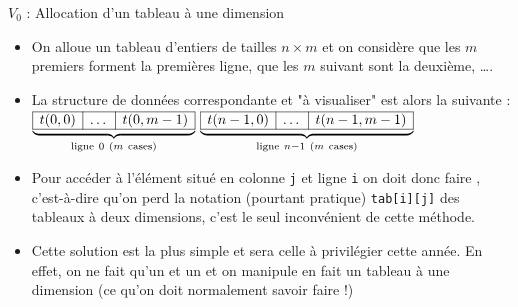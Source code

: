\documentclass[10pt]{beamer}
\begin{document}
\begin{frame}[fragile]{\Ctitle}{\stitle}
	\begin{block}{$V_0$ : Allocation d'un tableau à une dimension}
		\begin{itemize}
			\item<1-> On alloue un tableau d'entiers de tailles $n \times m$ et on considère que les $m$ premiers forment la premières ligne, que les $m$ suivant sont la deuxième, \dots.
			\item<2-> La structure de données correspondante et "à visualiser" est alors la suivante : \\
				$\underbrace{\begin{array}{|c|c|c|} \hline t(0,0)& \dots & t(0,m-1)\\ \hline \end{array}}_{\mathrm{ligne\ }0 \ (m \mathrm{\ cases})}$
				\dotfill
				$\underbrace{\begin{array}{|c|c|c|} \hline t(n-1,0)& \dots & t(n-1,m-1)\\ \hline \end{array}}_{\mathrm{ligne\ }n-1 \ (m \mathrm{\ cases})}$
			\item<3-> Pour accéder à l'élément situé en colonne {\tt j} et ligne {\tt i} on doit donc faire , c'est-à-dire qu'on perd la notation (pourtant pratique) {\tt tab[i][j]} des tableaux à deux dimensions, c'est le seul inconvénient de cette méthode.
			\item<4-> \textcolor{BrickRed}{Cette solution est la plus simple et sera celle à privilégier cette année}. En effet, on ne fait qu'un  et un  et on manipule en fait un tableau à une dimension (ce qu'on doit normalement savoir faire !)
		\end{itemize}
	\end{block}
\end{frame}
\end{document}
